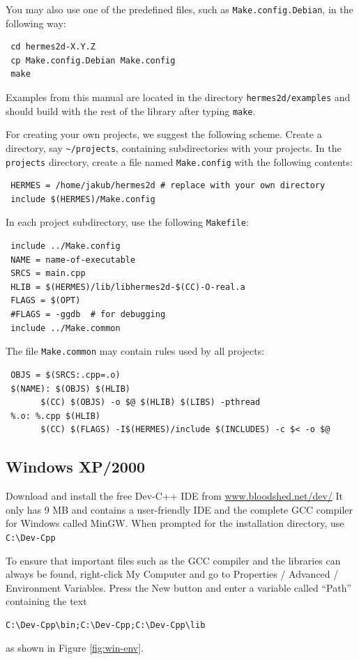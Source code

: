 You may also use one of the predefined files, such as {\tt Make.config.Debian},
in the following way:
\begin{lstlisting}
 cd hermes2d-X.Y.Z
 cp Make.config.Debian Make.config
 make
\end{lstlisting}

Examples from this manual are located in the directory {\tt hermes2d/examples} and
should build with the rest of the library after typing {\tt make}.

For creating your own projects, we suggest the following scheme. Create a directory,
say \verb"~/projects", containing subdirectories with your projects. In the
{\tt projects} directory, create a file named {\tt Make.config} with the following
contents:
\begin{lstlisting}
 HERMES = /home/jakub/hermes2d # replace with your own directory
 include $(HERMES)/Make.config
\end{lstlisting}
In each project subdirectory, use the following {\tt Makefile}:
\begin{lstlisting}
 include ../Make.config
 NAME = name-of-executable
 SRCS = main.cpp
 HLIB = $(HERMES)/lib/libhermes2d-$(CC)-O-real.a
 FLAGS = $(OPT)
 #FLAGS = -ggdb  # for debugging
 include ../Make.common
\end{lstlisting}
The file {\tt Make.common} may contain rules used by all projects:
\begin{lstlisting}
 OBJS = $(SRCS:.cpp=.o)
 $(NAME): $(OBJS) $(HLIB)
       $(CC) $(OBJS) -o $@ $(HLIB) $(LIBS) -pthread
 %.o: %.cpp $(HLIB)
       $(CC) $(FLAGS) -I$(HERMES)/include $(INCLUDES) -c $< -o $@
\end{lstlisting}




\subsection{Windows XP/2000}

Download and install the free Dev-C++ IDE from \url{www.bloodshed.net/dev/}
It only has 9 MB and contains a user-friendly IDE and the complete GCC compiler
for Windows called MinGW. When prompted for the installation directory,
use \verb"C:\Dev-Cpp"

To ensure that important files such as the GCC compiler and the libraries can
always be found, right-click My Computer and go to Properties / Advanced / Environment Variables.
Press the New button and enter a variable called ``Path'' containing the
text
\begin{lstlisting}
C:\Dev-Cpp\bin;C:\Dev-Cpp;C:\Dev-Cpp\lib
\end{lstlisting}
as shown in Figure \ref{fig:win-env}.

